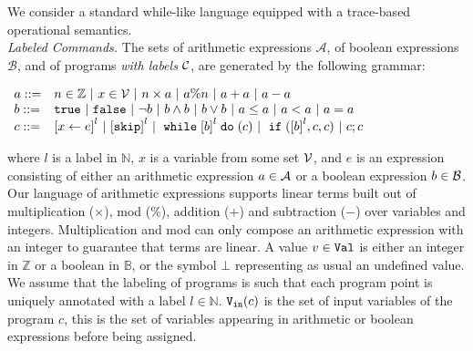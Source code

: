 We consider a standard while-like language equipped with a trace-based operational semantics.\\

\noindent\emph{Labeled Commands.}
The sets of arithmetic expressions $\mathcal{A}$, of boolean expressions $\mathcal{B}$, and  of programs \emph{with labels} $\mathcal{C}$, are generated by the following grammar:
\begin{center}
$
\begin{array}{ll}
\aexpr ::= &
n \in \mathbb{Z} ~|~ x \in \vardom ~|~ n \times \aexpr~|~ \aexpr \% n ~|~ \aexpr + \aexpr ~|~ \aexpr - \aexpr\\
\bexpr ::= & 
%
\etrue ~|~ \efalse  ~|~ \neg \bexpr
 ~|~ \bexpr \land \bexpr
%
~|~ \bexpr \lor \bexpr 
~|~ \aexpr \leq \aexpr 
~|~ \aexpr < \aexpr 
~|~ \aexpr = \aexpr \\
{c} ::= &
\clabel{\assign{x}{\expr}}^l 
~|~ \clabel{\eskip}^l
~|~ \ewhile \clabel{\bexpr}^{l} \edo ({c})
~|~ \eif(\clabel{\bexpr}^{l} , {c}, {c}) 
~|~ {c};{c} 
\end{array}
$
\end{center}
where $l$ is a label in $\mathbb{N}$, $x$ is a variable from
some set $\mathcal{V}$, and $e$ is an expression consisting of either an
arithmetic expression $a \in \mathcal{A}$ or a boolean
expression $b \in \mathcal{B}$. 
Our language of arithmetic expressions supports linear terms built out of  multiplication ($\times $), mod ($\%$), addition ($+$) and subtraction ($-$) over variables and integers. Multiplication and mod can only compose an arithmetic expression with an integer to guarantee that terms are linear. 
A value $v\in \mathtt{Val}$ is either an integer in $\mathbb{Z}$ or a boolean in $\mathbb{B}$, or the symbol $\bot$ representing as usual an undefined value.
We 
assume that the labeling of programs is such that each program
point is uniquely annotated with a label $l\in\mathbb{N}$.
${\mathtt{V_{\mathtt{in}}}}(c)$ is the set of input variables of the program $c$, this is the set of variables appearing in arithmetic or boolean expressions before being assigned.
%


